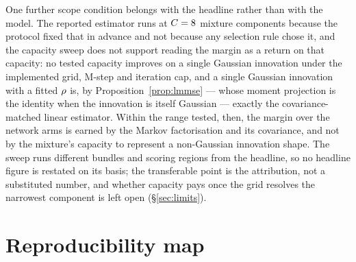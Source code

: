 One further scope condition belongs with the headline rather than with the model. The reported
estimator runs at $C=8$ mixture components because the protocol fixed that in advance and not
because any selection rule chose it, and the capacity sweep does not support reading the margin as
a return on that capacity: no tested capacity improves on a single Gaussian innovation under the
implemented grid, M-step and iteration cap, and a single Gaussian innovation with a fitted $\rho$
is, by Proposition~\ref{prop:lmmse} --- whose moment projection is the identity when the
innovation is itself Gaussian --- exactly the covariance-matched linear estimator. Within the
range tested, then, the margin over the network arms is earned by the Markov factorisation and its
covariance, and not by the mixture's capacity to represent a non-Gaussian innovation shape. The
sweep runs different bundles and scoring regions from the headline, so no headline figure is
restated on its basis; the transferable point is the attribution, not a substituted number, and
whether capacity pays once the grid resolves the narrowest component is left open
(\S\ref{sec:limits}).

\section{Reproducibility map}
\label{app:repro}

